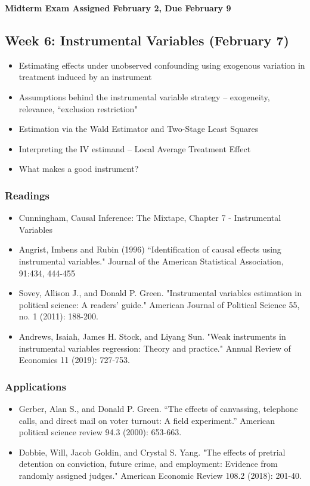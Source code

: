 \documentclass[11pt, article, oneside]{memoir}
\theoremstyle{Assumption}
\begin{document}
\textbf{Midterm Exam Assigned February 2, Due February 9}

\subsection{Week 6: Instrumental Variables (February 7)}

\begin{itemize}
\item Estimating effects under unobserved confounding using exogenous variation in treatment induced by an instrument
\item Assumptions behind the instrumental variable strategy -- exogeneity, relevance, ``exclusion restriction"
\item Estimation via the Wald Estimator and Two-Stage Least Squares
\item Interpreting the IV estimand -- Local Average Treatment Effect 
\item What makes a good instrument?
\end{itemize}


\subsubsection*{Readings}

\begin{itemize}
\item Cunningham, Causal Inference: The Mixtape, Chapter 7 - Instrumental Variables
\item Angrist, Imbens and Rubin (1996) ``Identification of causal effects using instrumental variables." Journal of the American Statistical Association, 91:434, 444-455
\item Sovey, Allison J., and Donald P. Green. "Instrumental variables estimation in political science: A readers’ guide." American Journal of Political Science 55, no. 1 (2011): 188-200.
\item Andrews, Isaiah, James H. Stock, and Liyang Sun. "Weak instruments in instrumental variables regression: Theory and practice." Annual Review of Economics 11 (2019): 727-753.
\end{itemize}

\subsubsection{Applications}

\begin{itemize}
\item Gerber, Alan S., and Donald P. Green. “The effects of canvassing, telephone calls,
and direct mail on voter turnout: A field experiment.” American political science
review 94.3 (2000): 653-663.
\item Dobbie, Will, Jacob Goldin, and Crystal S. Yang. "The effects of pretrial detention on conviction, future crime, and employment: Evidence from randomly assigned judges." American Economic Review 108.2 (2018): 201-40.
\end{itemize}
\end{document}
